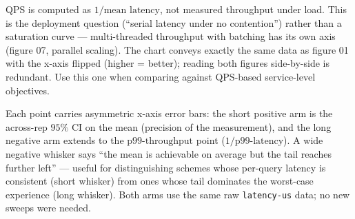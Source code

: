 QPS is computed as $1/\text{mean latency}$, not measured throughput
under load. This is the deployment question (``serial latency under
no contention'') rather than a saturation curve --- multi-threaded
throughput with batching has its own axis (figure 07, parallel
scaling). The chart conveys exactly the same data as figure 01 with
the x-axis flipped (higher = better); reading both figures
side-by-side is redundant. Use this one when comparing against
QPS-based service-level objectives.

Each point carries asymmetric x-axis error bars: the short positive
arm is the across-rep $95\%$ CI on the mean (precision of the
measurement), and the long negative arm extends to the
$\text{p99-throughput}$ point ($1/\text{p99-latency}$). A wide
negative whisker says ``the mean is achievable on average but the
tail reaches further left'' --- useful for distinguishing schemes
whose per-query latency is consistent (short whisker) from ones
whose tail dominates the worst-case experience (long whisker). Both
arms use the same raw \texttt{latency-us} data; no new sweeps were
needed.
